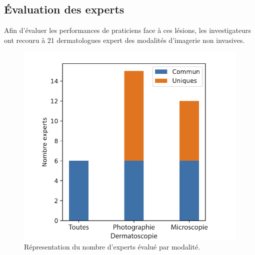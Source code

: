 \addtocounter{footnote}{1}
\addtocounter{footnote}{1}
\addtocounter{footnote}{1}

\subsection{Évaluation des experts}
Afin d'évaluer les performances de praticiens face à ces lésions, les investigateurs ont recouru à 21 dermatologues expert des modalités d'imagerie non invasives.  
\begin{figure}[H]
    \centering
    \includegraphics[width=0.4\linewidth]{contents/chapter_2/resources/experts_evaluation.pdf}
    \caption{Répresentation du nombre d'experts évalué par modalité.}
    \label{fig:experts_evaluation}
\end{figure}\par
 

